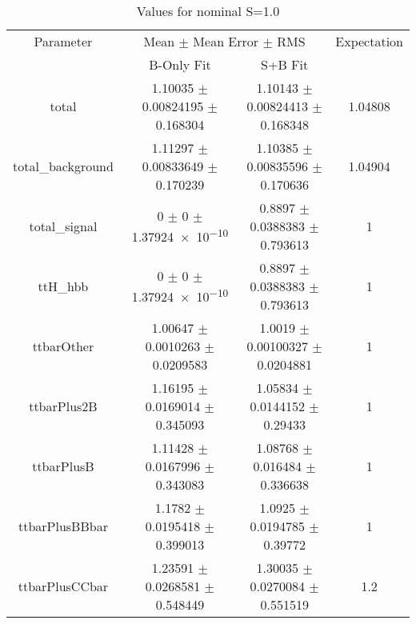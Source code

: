 \begin{table}
\centering
\caption{Values for nominal S=1.0}
\begin{tabular}{cccc}
\toprule
Parameter & \multicolumn{2}{c}{Mean $\pm$ Mean Error $\pm$ RMS} & Expectation\\
 & B-Only Fit & S+B Fit & \\
\midrule
total & \num{1.10035} $\pm$ \num{0.00824195} $\pm$ \num{0.168304} & \num{1.10143} $\pm$ \num{0.00824413} $\pm$ \num{0.168348} & \num{1.04808}\\
total\_background & \num{1.11297} $\pm$ \num{0.00833649} $\pm$ \num{0.170239} & \num{1.10385} $\pm$ \num{0.00835596} $\pm$ \num{0.170636} & \num{1.04904}\\
total\_signal & \num{0} $\pm$ \num{0} $\pm$ \num{1.37924e-10} & \num{0.8897} $\pm$ \num{0.0388383} $\pm$ \num{0.793613} & \num{1}\\
ttH\_hbb & \num{0} $\pm$ \num{0} $\pm$ \num{1.37924e-10} & \num{0.8897} $\pm$ \num{0.0388383} $\pm$ \num{0.793613} & \num{1}\\
ttbarOther & \num{1.00647} $\pm$ \num{0.0010263} $\pm$ \num{0.0209583} & \num{1.0019} $\pm$ \num{0.00100327} $\pm$ \num{0.0204881} & \num{1}\\
ttbarPlus2B & \num{1.16195} $\pm$ \num{0.0169014} $\pm$ \num{0.345093} & \num{1.05834} $\pm$ \num{0.0144152} $\pm$ \num{0.29433} & \num{1}\\
ttbarPlusB & \num{1.11428} $\pm$ \num{0.0167996} $\pm$ \num{0.343083} & \num{1.08768} $\pm$ \num{0.016484} $\pm$ \num{0.336638} & \num{1}\\
ttbarPlusBBbar & \num{1.1782} $\pm$ \num{0.0195418} $\pm$ \num{0.399013} & \num{1.0925} $\pm$ \num{0.0194785} $\pm$ \num{0.39772} & \num{1}\\
ttbarPlusCCbar & \num{1.23591} $\pm$ \num{0.0268581} $\pm$ \num{0.548449} & \num{1.30035} $\pm$ \num{0.0270084} $\pm$ \num{0.551519} & \num{1.2}\\
\bottomrule
\end{tabular}
\end{table}